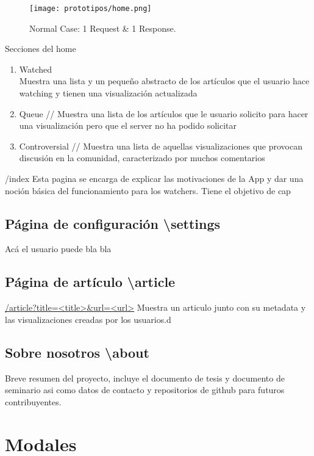 \begin{figure}[ht]
    \centering
         \texttt{[image: prototipos/home.png]}
          \caption{Normal Case: 1 Request \& 1 Response.}
           \label{normal_case}
\end{figure}


Secciones del home
\begin{enumerate}
    \item Watched \\ Muestra una lista y un pequeño abstracto de los artículos que el usuario hace watching y tienen una visualización actualizada
    \item Queue // Muestra una lista de los artículos que le usuario solicito para hacer una visualización pero que el server no ha podido solicitar
    \item Controversial // Muestra una lista de aquellas visualizaciones que provocan discusión en la comunidad, caracterizado por muchos comentarios
\end{enumerate}


/index
Esta pagina se encarga de explicar las motivaciones de la App y dar una noción básica del funcionamiento para los watchers.
Tiene el objetivo de cap


\subsection{Página de configuración \textbackslash settings}
Acá el usuario puede bla bla 


\subsection{Página de artículo \textbackslash article} 
\url{/article?title=<title>&url=<url>}
Muestra un articulo junto con su metadata y las visualizaciones creadas por los usuarios.d


\subsection{Sobre nosotros \textbackslash about} 
Breve resumen del proyecto, incluye el documento de tesis y documento de seminario asi como datos de contacto y repositorios de github para futuros contribuyentes.

\section{Modales}


